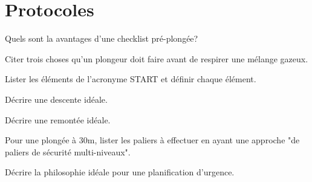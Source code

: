 \documentclass[english,12pt,a4paper]{article}
\begin{document}
	\section{Protocoles}
	\begin{outline}
		\1 Quels sont la avantages d'une checklist pré-plongée?
			\2 \hspace{-2em}\hrulefill
			\2 \hspace{-2em}\hrulefill
			\2 \hspace{-2em}\hrulefill

		\1 Citer trois choses qu'un plongeur doit faire avant de respirer une mélange gazeux.
			\2 \hspace{-2em}\hrulefill
			\2 \hspace{-2em}\hrulefill
			\2 \hspace{-2em}\hrulefill

		\1 Lister les éléments de l'acronyme START et définir chaque élément.
			\2[S] \hrulefill
			\2[T] \hrulefill
			\2[A] \hrulefill
			\2[R] \hrulefill
			\2[T] \hrulefill

		\1 Décrire une descente idéale.
			\2 \hspace{-2em}\hrulefill
			\2 \hspace{-2em}\hrulefill
			\2 \hspace{-2em}\hrulefill

		\1 Décrire une remontée idéale.
			\2 \hspace{-2em}\hrulefill
			\2 \hspace{-2em}\hrulefill
			\2 \hspace{-2em}\hrulefill

		\1 Pour une plongée à 30m, lister les paliers à effectuer en ayant une approche "de paliers de sécurité multi-niveaux".
			\2 \hspace{-2em}\hrulefill
			\2 \hspace{-2em}\hrulefill
			\2 \hspace{-2em}\hrulefill

		\1 Décrire la philosophie idéale pour une planification d'urgence.
			\2 \hspace{-2em}\hrulefill
			\2 \hspace{-2em}\hrulefill
			\2 \hspace{-2em}\hrulefill
	\end{outline}
	\pagebreak

\end{document}
